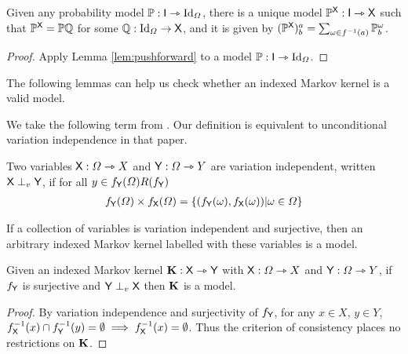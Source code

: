 \begin{corollary}\label{corr:pushforward}
Given any probability model $\mathbb{P}:\mathsf{I}\rightarrowtriangle \text{Id}_\Omega$, there is a unique model $\mathbb{P}^{\mathsf{X}}:\mathsf{I}\rightarrowtriangle \mathsf{X}$ such that $\mathbb{P}^{\mathsf{X}}=\mathbb{P}\mathbb{Q}$ for some $\mathbb{Q}:\text{Id}_\Omega\to \mathsf{X}$, and it is given by $(\mathbb{P}^{\mathsf{X}})^a_b = \sum_{\omega\in f^{-1}(a)} \mathbb{P}_b^{\omega}$.
\end{corollary}

\begin{proof}
Apply Lemma \ref{lem:pushforward} to a model $\mathbb{P}:\mathsf{I}\rightarrowtriangle\text{Id}_{\Omega}$.
\end{proof}

The following lemmas can help us check whether an indexed Markov kernel is a valid model.



We take the following term from \citet{constantinou_extended_2017}. Our definition is equivalent to unconditional variation independence in that paper.

\begin{definition}
Two variables $\mathsf{X}:\Omega\rightarrowtriangle X$ and $\mathsf{Y}:\Omega\rightarrowtriangle Y$ are variation independent, written $\mathsf{X}\perp_v \mathsf{Y}$, if for all $y\in f_{\mathsf{Y}}(\Omega)R(f_{\mathsf{Y}})$
\begin{align}
 f_{\mathsf{Y}}(\Omega) \times f_{\mathsf{X}}(\Omega) = \{(f_{\mathsf{Y}}(\omega),f_{\mathsf{X}}(\omega))|\omega\in \Omega\}
\end{align}
\end{definition}

If a collection of variables is variation independent and surjective, then an arbitrary indexed Markov kernel labelled with these variables is a model.

\begin{lemma}\label{lem:var_indep}
Given an indexed Markov kernel $\mathbf{K}:\mathsf{X} \rightarrowtriangle \mathsf{Y}$ with $\mathsf{X}:\Omega\rightarrowtriangle X$ and $\mathsf{Y}:\Omega\rightarrowtriangle Y$, if $f_{\mathsf{Y}}$ is surjective and $\mathsf{Y}\perp_v \mathsf{X}$ then $\mathbf{K}$ is a model.
\end{lemma}

\begin{proof}
By variation independence and surjectivity of $f_{\mathsf{Y}}$, for any $x\in X$, $y\in Y$, $f_{\mathsf{X}}^{-1}(x)\cap f_{\mathsf{Y}}^{-1}(y) = \emptyset \implies f_{\mathsf{X}}^{-1}(x) = \emptyset$. Thus the criterion of consistency places no restrictions on $\mathbf{K}$.
\end{proof}

